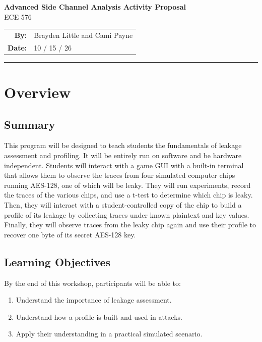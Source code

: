 \documentclass[11pt]{article}
\begin{document}
 
\begin{center}
  {\Huge\bfseries\color{accent} Advanced Side Channel Analysis Activity Proposal} \\[0.4em]
  {\large ECE 576} \\[1em]
  {\normalsize
    \begin{tabular}{rl}
      \textbf{By:} & Brayden Little and Cami Payne \\
      \textbf{Date:} & 10 / 15 / 26 \\
    \end{tabular}
  }
\end{center}
 
\vspace{1em}
\hrule
 
\section{Overview}
 
\subsection{Summary}
This program will be designed to teach students the fundamentals of leakage assessment and profiling. It will be entirely run on software and be hardware independent. Students will interact with a game GUI with a built-in terminal that allows them to observe the traces from four simulated computer chips running AES-128, one of which will be leaky. They will run experiments, record the traces of the various chips, and use a t-test to determine which chip is leaky. Then, they will interact with a student-controlled copy of the chip to build a profile of its leakage by collecting traces under known plaintext and key values. Finally, they will observe traces from the leaky chip again and use their profile to recover one byte of its secret AES-128 key.
 
\subsection{Learning Objectives}
By the end of this workshop, participants will be able to:
\begin{enumerate}[label=\arabic*.]
  \item{} Understand the importance of leakage assessment.
  \item{} Understand how a profile is built and used in attacks.
  \item{} Apply their understanding in a practical simulated scenario.
\end{enumerate}
\end{document}
